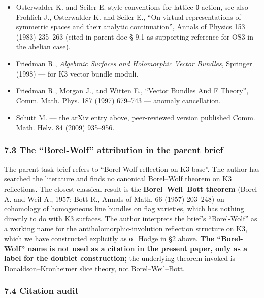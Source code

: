 \documentclass[
 11pt,
 a4paper,
]{article}
\begin{document}
\begin{itemize}
\item
 Osterwalder K. and Seiler E.-style conventions for lattice θ-action, see also Frohlich J., Osterwalder K. and Seiler E., ``On virtual representations of symmetric spaces and their analytic continuation'', Annals of Physics 153 (1983) 235--263 (cited in parent doc § 9.1 as supporting reference for OS3 in the abelian case).
\item
 Friedman R., \emph{Algebraic Surfaces and Holomorphic Vector Bundles}, Springer (1998) --- for K3 vector bundle moduli.
\item
 Friedman R., Morgan J., and Witten E., ``Vector Bundles And F Theory'', Comm. Math. Phys. 187 (1997) 679--743 --- anomaly cancellation.
\item
 Schütt M. --- the arXiv entry above, peer-reviewed version published Comm. Math. Helv. 84 (2009) 935--956.
\end{itemize}

\hypertarget{the-borel-wolf-attribution-in-the-parent-brief}{%
\subsubsection{7.3 The ``Borel-Wolf'' attribution in the parent brief}\label{the-borel-wolf-attribution-in-the-parent-brief}}

The parent task brief refers to ``Borel-Wolf reflection on K3 base''. The author has searched the literature and finds no canonical Borel--Wolf theorem on K3 reflections. The closest classical result is the \textbf{Borel--Weil--Bott theorem} (Borel A. and Weil A., 1957; Bott R., Annals of Math. 66 (1957) 203--248) on cohomology of homogeneous line bundles on flag varieties, which has nothing directly to do with K3 surfaces. The author interprets the brief's ``Borel-Wolf'' as a working name for the antiholomorphic-involution reflection structure on K3, which we have constructed explicitly as σ\_Hodge in §2 above. \textbf{The ``Borel-Wolf'' name is not used as a citation in the present paper, only as a label for the doublet construction;} the underlying theorem invoked is Donaldson--Kronheimer slice theory, not Borel--Weil--Bott.

\hypertarget{cluster-fab-audit}{%
\subsubsection{7.4 Citation audit}\label{cluster-fab-audit}}
\end{document}
